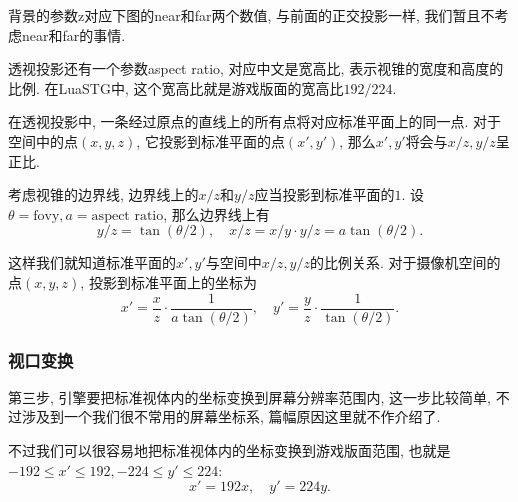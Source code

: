 背景的参数z对应下图的near和far两个数值,
与前面的正交投影一样, 我们暂且不考虑near和far的事情.

透视投影还有一个参数aspect ratio, 对应中文是宽高比,
表示视锥的宽度和高度的比例.
在LuaSTG中, 这个宽高比就是游戏版面的宽高比$192/224$.

\begin{center}
\end{center}

在透视投影中, 一条经过原点的直线上的所有点将对应标准平面上的同一点.
对于空间中的点$(x,y,z)$, 它投影到标准平面的点$(x',y')$,
那么$x',y'$将会与$x/z,y/z$呈正比.

考虑视锥的边界线, 边界线上的$x/z$和$y/z$应当投影到标准平面的$1$.
设$\theta = \text{fovy}, a = \text{aspect ratio}$, 那么边界线上有
\[
  y/z = \tan(\theta/2),\quad
  x/z = x/y \cdot y/z = a\tan(\theta/2).
\]

这样我们就知道标准平面的$x',y'$与空间中$x/z,y/z$的比例关系.
对于摄像机空间的点$(x,y,z)$, 投影到标准平面上的坐标为
\[
  x' = \dfrac{x}{z}\cdot\dfrac{1}{a\tan(\theta/2)},\quad
  y' = \dfrac{y}{z}\cdot\dfrac{1}{\tan(\theta/2)}.
\]

\subsubsection{视口变换}

第三步, 引擎要把标准视体内的坐标变换到屏幕分辨率范围内,
这一步比较简单, 不过涉及到一个我们很不常用的屏幕坐标系,
篇幅原因这里就不作介绍了.

不过我们可以很容易地把标准视体内的坐标变换到游戏版面范围,
也就是$-192\le x'\le192, -224\le y'\le224$:
\[
x' = 192x,\quad y' = 224y.
\]

